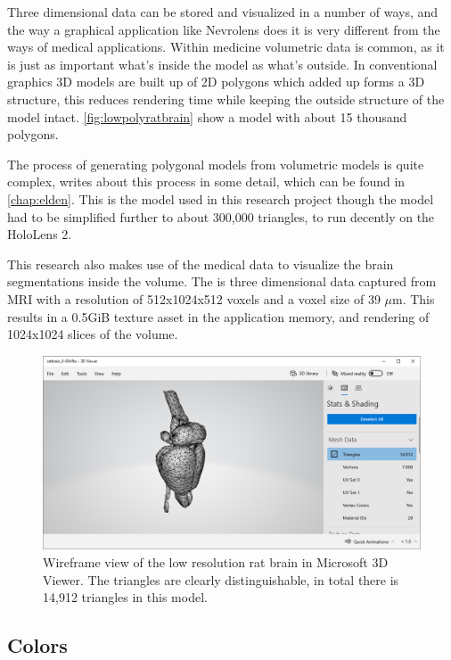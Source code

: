 Three dimensional data can be stored and visualized in a number of ways, and the way a graphical application like Nevrolens does it is very different from the ways of medical applications. Within medicine volumetric data is common, as it is just as important what's inside the model as what's outside. In conventional graphics 3D models are built up of 2D polygons which added up forms a 3D structure, this reduces rendering time while keeping the outside structure of the model intact. \autoref{fig:lowpolyratbrain} show a model with about 15 thousand polygons. 

The process of generating polygonal models from volumetric models is quite complex, \citet{Elden2017} writes about this process in some detail, which can be found in \autoref{chap:elden}. This is the model used in this research project though the model had to be simplified further to about 300,000 triangles, to run decently on the HoloLens 2.  

This research also makes use of the medical data to visualize the brain segmentations inside the volume. The is three dimensional data captured from MRI with a resolution of 512x1024x512 voxels and a voxel size of 39 $\mu$m. This results in a 0.5GiB texture asset in the application memory, and rendering of 1024x1024 slices of the volume.

\begin{figure}[ht]
    \centering
    \includegraphics[width=\textwidth]{fig/ratbrain_lowpoly}
    \caption{Wireframe view of the low resolution rat brain in Microsoft 3D Viewer. The triangles are clearly distinguishable, in total there is 14,912 triangles in this model. }
    \label{fig:lowpolyratbrain}
\end{figure}



\subsection*{Colors}

